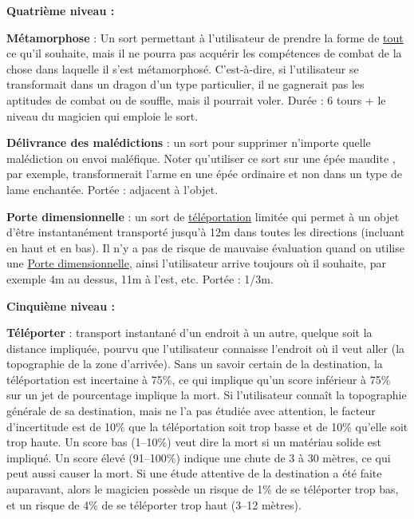 \textbf{Quatrième niveau :}

\bigskip

\label{sort-metamorphose}\textbf{Métamorphose} : Un sort permettant à l'utilisateur de prendre la forme de \underline{tout} ce qu'il souhaite, mais il ne pourra pas acquérir les compétences de combat de la chose dans laquelle il s'est métamorphosé. C'est-à-dire, si l'utilisateur se transformait dans un dragon d'un type particulier, il ne gagnerait pas les aptitudes de combat ou de souffle, mais il pourrait voler. Durée : 6 tours + le niveau du magicien qui emploie le sort.

\bigskip

\label{sort-delivrance-malediction}\textbf{Délivrance des malédictions} : un sort pour supprimer n'importe quelle malédiction ou envoi maléfique. Noter qu'utiliser ce sort sur une \og épée maudite \fg{}, par exemple, transformerait l'arme en une épée ordinaire et non dans un type de lame enchantée. Portée : adjacent à l'objet.

\bigskip

\label{sort-porte-dimensionnelle}\textbf{Porte dimensionnelle} : un sort de \uline{téléportation} limitée qui permet à un objet d'être instantanément transporté jusqu'à 12m dans toutes les directions (incluant en haut et en bas). Il n'y a pas de risque de mauvaise évaluation quand on utilise une \uline{Porte dimensionnelle}, ainsi l'utilisateur arrive toujours où il souhaite, par exemple 4m au dessus, 11m à l'est, etc. Portée : 1/3m.

\bigskip

\textbf{Cinquième niveau :}

\bigskip

\label{sort-teleporter}\textbf{Téléporter} : transport instantané d'un endroit à un autre, quelque soit la distance impliquée, pourvu que l'utilisateur connaisse l'endroit où il veut aller (la topographie de la zone d'arrivée). Sans un savoir certain de la destination, la téléportation est incertaine à 75\%, ce qui implique qu'un score inférieur à 75\% sur un jet de pourcentage implique la mort. Si l'utilisateur connaît la topographie générale de sa destination, mais ne l'a pas étudiée avec attention, le facteur d'incertitude est de 10\% que la téléportation soit trop basse et de 10\% qu'elle soit trop haute. Un score bas (1--10\%) veut dire la mort si un matériau solide est impliqué. Un score élevé (91--100\%) indique une chute de 3 à 30 mètres, ce qui peut aussi causer la mort. Si une étude attentive de la destination a été faite auparavant, alors le magicien possède un risque de 1\% de se téléporter trop bas, et un risque de 4\% de se téléporter trop haut (3--12 mètres).


